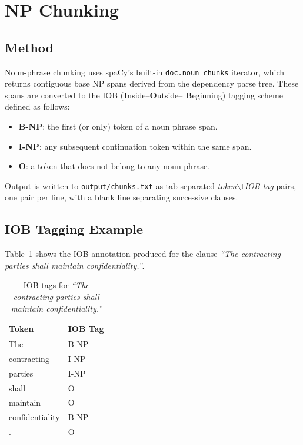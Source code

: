 \documentclass[assignment.tex]{subfiles}
\begin{document}
\section{NP Chunking}
\label{subsec:np-chunking}

\subsection{Method}

Noun-phrase chunking uses spaCy's built-in \texttt{doc.noun\_chunks} iterator,
which returns contiguous base NP spans derived from the dependency parse tree.
These spans are converted to the IOB (\textbf{I}nside--\textbf{O}utside--%
\textbf{B}eginning) tagging scheme defined as follows:

\begin{itemize}[leftmargin=*, itemsep=2pt]
    \item \textbf{B-NP}: the first (or only) token of a noun phrase span.
    \item \textbf{I-NP}: any subsequent continuation token within the same span.
    \item \textbf{O}:    a token that does not belong to any noun phrase.
\end{itemize}

Output is written to \texttt{output/chunks.txt} as tab-separated
\textit{token}$\backslash$t\textit{IOB-tag} pairs, one pair per line, with a blank
line separating successive clauses.

\subsection{IOB Tagging Example}

Table~\ref{tab:iob-example} shows the IOB annotation produced for the clause
\textit{``The contracting parties shall maintain confidentiality.''}.

\begin{table}[H]
    \centering
    \caption{IOB tags for \textit{``The contracting parties shall maintain
    confidentiality.''}}
    \label{tab:iob-example}
    \begin{tabular}{@{}ll@{}}
        \toprule
        \textbf{Token}   & \textbf{IOB Tag} \\
        \midrule
        The              & B-NP \\
        contracting      & I-NP \\
        parties          & I-NP \\
        shall            & O    \\
        maintain         & O    \\
        confidentiality  & B-NP \\
        .                & O    \\
        \bottomrule
    \end{tabular}
\end{table}
\end{document}
